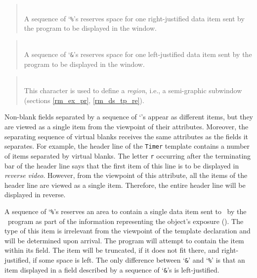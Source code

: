 \begin{quote}
\noindent\hspace{-0.35in}{\bf {\tt \%}}\\ \hspace{0in}
A sequence of `{\tt \%}'s reserves space for one right-justified
data item sent by the {\smurph} program to be displayed in the window.
\end{quote}

\begin{quote}
\noindent\hspace{-0.35in}{\bf {\tt \&}}\\ \hspace{0in}
A sequence of `{\tt \&}'s reserves space for one left-justified
data item sent by the {\smurph} program
to be displayed in the window.
\end{quote}

\begin{quote}
\noindent{}\\ \hspace{0in}
This character is used to define a {\em region\/}, i.e., a semi-graphic
subwindow (sections \ref{rm_ex_pr}, \ref{rm_ds_tp_re}).
\end{quote}\medskip

Non-blank fields separated by a sequence of `{\tt {}}'s
appear as different items, but
they are viewed as a single item from the viewpoint of their attributes.
Moreover, the separating sequence of virtual blanks receives the same
attributes as the fields it separates.
For example, the header line of the {\tt Timer} template contains a number
of items separated by virtual blanks.
The letter {\tt r} occurring after the terminating bar of the header
line says that the first item of this line is to be displayed in
{\em reverse video}.
However, from the viewpoint of this attribute, all the items of the header
line are viewed as a single item.
Therefore, the entire header line will be displayed in reverse.

A sequence of `{\tt \%}'s reserves an area to contain a
single data item sent to \dsd\ by the \smurph\ program as part of the
information representing the object's exposure ().
The type of this item is irrelevant from the viewpoint of the
template declaration and will be determined upon arrival.
The program will attempt to contain the item within its field.
The item will be truncated, if it does not fit there, and right-justified,
if some space is left.
The only difference between `{\tt \&}' and `{\tt \%}' is that an item
displayed in a field described by a sequence of `{\tt \&}'s is left-justified.

